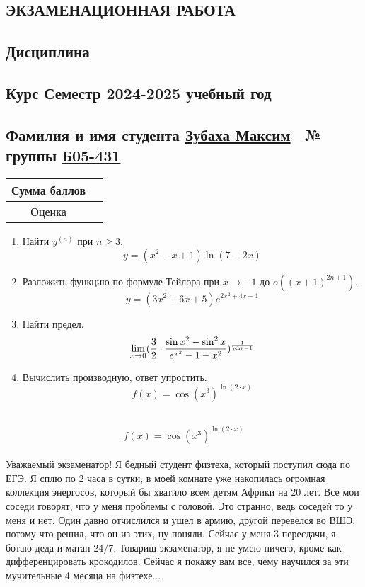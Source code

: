 \documentclass{article}
\begin{document}
\begin{Large}
\begin{onehalfspace}
\begin{center}
\section*{\huge ЭКЗАМЕНАЦИОННАЯ РАБОТА}
\subsection*{\large Дисциплина }
\subsection*{Курс  Семестр  2024-2025 учебный год}
\subsection*{Фамилия и имя студента \underline{Зубаха Максим}\ \hspace{2cm} № группы \underline{Б05-431}}
\begin{tabular}{|c|c|}
\hline 
Сумма баллов & \hspace{8cm} \\ 
\hline 
Оценка & \hspace{8cm} \\ 
\hline 
\end{tabular} 
\vspace{1cm} 
\hline 
\end{center} 
\begin{large} 
\begin{enumerate} 
\item Найти $y^{(n)}$ при $n \geq 3$. $$y = (x^2 - x + 1)\ln(7-2x)$$ 
\hline 
\item Разложить функцию по формуле Тейлора при $x \rightarrow -1$ до $o((x + 1)^{2n+1})$. $$y = (3x^2 + 6x + 5)e^{2x^2+4x-1}$$ 
\hline 
\item Найти предел. $$\lim\limits_{x \rightarrow 0}(\frac{3}{2} \cdot \frac{\sin{x^2} - \sin^2 x}{e^{x^2} - 1 - x^2})^{\frac{1}{\ch x - 1}}$$ 
\hline 
\item Вычислить производную, ответ упростить. 
$$ f(x) = \cos(x^{3})^{\ln(2 \cdot x)}$$\ \hline \
\end{enumerate}
\end{large}
$$ f(x) = \cos(x^{3})^{\ln(2 \cdot x)}$$\\
Уважаемый экзаменатор! Я бедный студент физтеха, который поступил сюда по ЕГЭ. Я сплю по 2 часа в сутки, в моей комнате уже накопилась огромная коллекция энергосов, который бы хватило всем детям Африки на 20 лет. Все мои соседи говорят, что у меня проблемы с головой. Это странно, ведь соседей то у меня и нет. Один давно отчислился и ушел в армию, другой перевелся во ВШЭ, потому что решил, что он из этих, ну поняли. Сейчас у меня 3 пересдачи, я ботаю деда и матан 24/7. Товарищ экзаменатор, я не умею ничего, кроме как дифференцировать крокодилов. Сейчас я покажу вам все, чему научился за эти мучительные 4 месяца на физтехе...

\end{onehalfspace}
\end{Large}
\end{document}
